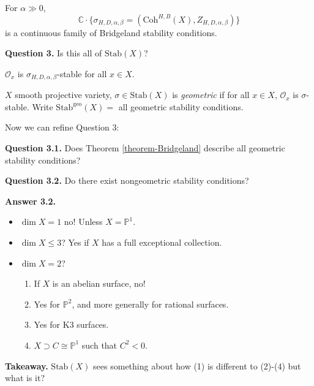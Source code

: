 \begin{theorem}
\label{theorem-Bridgeland}
For $\alpha\gg 0$,
$$
\mathbb{C}\cdot \{\sigma_{H,D,\alpha,\beta}=
(\text{Coh}^{H,B}(X),Z_{H,D,\alpha,\beta})\}
$$
is a continuous family of Bridgeland stability conditions.
\end{theorem}

\noindent
{\bf Question 3.} Is this all of $\text{Stab}(X)$?

\begin{exercise}
\label{exercise-O-is-stable}
$\mathcal{O}_x$ is $\sigma_{H,D,\alpha,\beta}$-stable for all $x\in X$.
\end{exercise}

\begin{definition}
\label{definition-geometric-projective-variety}
$X$ smooth projective variety, $\sigma \in \text{Stab}(X)$ is {\it geometric} if
for all $x \in X$, $\mathcal{O}_x$ is $\sigma$-stable. Write
$\text{Stab}^{\text{geo}}(X)=$ all geometric stability conditions.
\end{definition}

\medskip\noindent
Now we can refine Question 3:

\medskip\noindent
{\bf Question 3.1.} Does Theorem \ref{theorem-Bridgeland} describe all geometric
stability conditions?

\medskip\noindent
{\bf Question 3.2.} Do there exist nongeometric stability conditions?

\medskip\noindent
{\bf Answer 3.2.}
\begin{itemize}
\item $\dim X=1$ no! Unless $X=\mathbb{P}^1$.
\item $\dim X \leq 3$? Yes if $X$ has a full exceptional collection.
\item $\dim X=2$?
\begin{enumerate}
\item If $X$ is an abelian surface, no!
\item Yes for $\mathbb{P}^2$, and more generally for rational surfaces.
\item Yes for K3 surfaces.
\item $X \supset C \cong \mathbb{P}^1$ such that $C^2 < 0$.
\end{enumerate}
\end{itemize}

\medskip\noindent
{\bf Takeaway.} $\text{Stab}(X)$ sees something about how (1) is different to
(2)-(4) but what is it?

